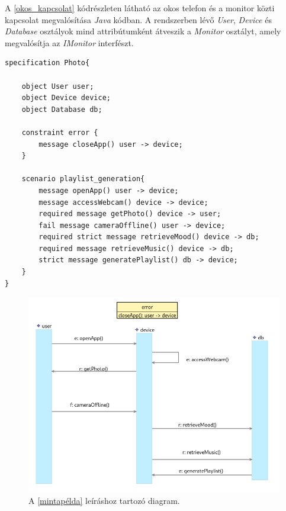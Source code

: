 A \ref{okos_kapcsolat} kódrészleten látható az okos telefon és a monitor közti kapcsolat megvalósítása \textit{Java} kódban.
A rendszerben lévő \textit{User}, \textit{Device} és \textit{Database} osztályok mind attribútumként átveszik a \textit{Monitor} osztályt, amely megvalósítja az \textit{IMonitor} interfészt.

\begin{lstlisting}[frame=single, float=ht!, caption={Okos telefon működésére megadott szcenárió követelmény.},captionpos=b, label=mintapélda]
specification Photo{

	object User user;
	object Device device;
	object Database db;

	constraint error {
		message closeApp() user -> device;
	}

	scenario playlist_generation{
		message openApp() user -> device;
		message accessWebcam() device -> device;
		required message getPhoto() device -> user;
		fail message cameraOffline() user -> device;
		required strict message retrieveMood() device -> db;
		required message retrieveMusic() device -> db;
		strict message generatePlaylist() db -> device;
	}
}
\end{lstlisting}

\begin{figure}[!ht]
    \centering
    \includegraphics[width=150mm, keepaspectratio]{figures/monitor_device_visualisation_diagram.png}
    \caption{A \ref{mintapélda} leíráshoz tartozó diagram.}
	\label{monitor_visualisation}
\end{figure}


